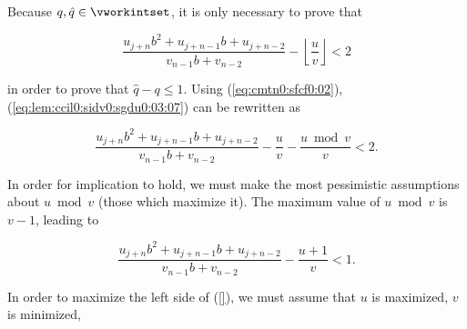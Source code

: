 \begin{vworklemmaproof}
Because $q, \hat{q} \in \vworkintset$, it is only necessary to prove that

\begin{equation}
\label{eq:lem:ccil0:sidv0:sgdu0:03:07}
\frac{u_{j+n} b^2 + u_{j+n-1}b + u_{j+n-2}}{v_{n-1}b + v_{n-2}} -
\left\lfloor \frac{u}{v} \right\rfloor
< 2
\end{equation}

in order to prove that $\hat{q}-q \leq 1$.  Using
(\cmtnzeroxrefhyphen\ref{eq:cmtn0:sfcf0:02}), 
(\ref{eq:lem:ccil0:sidv0:sgdu0:03:07}) can be rewritten as

\begin{equation}
\label{eq:lem:ccil0:sidv0:sgdu0:03:08}
\frac{u_{j+n} b^2 + u_{j+n-1}b + u_{j+n-2}}{v_{n-1}b + v_{n-2}} -
\frac{u}{v} -
\frac{u \bmod v}{v}
< 2 .
\end{equation}

In order for implication to hold, we must make the most pessimistic
assumptions about $u \bmod v$ (those which maximize it).  The maximum value
of $u \bmod v$ is $v-1$, leading to

\begin{equation}
\label{eq:lem:ccil0:sidv0:sgdu0:03:09}
\frac{u_{j+n} b^2 + u_{j+n-1}b + u_{j+n-2}}{v_{n-1}b + v_{n-2}} -
\frac{u + 1}{v}
< 1 .
\end{equation}

In order to maximize the left side of (\ref{}),
we must assume that $u$ is maximized, $v$ is minimized, 


\end{vworklemmaproof}
\vworklemmafooter{}

